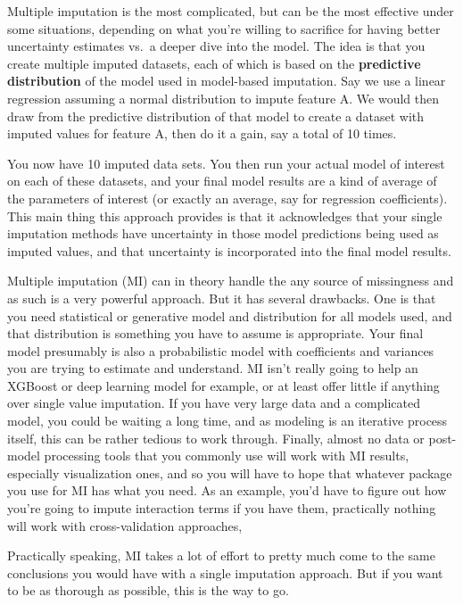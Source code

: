 \documentclass[
  letterpaper,
]{krantz}
\begin{document}
Multiple imputation is the most complicated, but can be the most
effective under some situations, depending on what you're willing to
sacrifice for having better uncertainty estimates vs.~a deeper dive into
the model. The idea is that you create multiple imputed datasets, each
of which is based on the \textbf{predictive distribution} of the model
used in model-based imputation. Say we use a linear regression assuming
a normal distribution to impute feature A. We would then draw from the
predictive distribution of that model to create a dataset with imputed
values for feature A, then do it a gain, say a total of 10 times.

You now have 10 imputed data sets. You then run your actual model of
interest on each of these datasets, and your final model results are a
kind of average of the parameters of interest (or exactly an average,
say for regression coefficients). This main thing this approach provides
is that it acknowledges that your single imputation methods have
uncertainty in those model predictions being used as imputed values, and
that uncertainty is incorporated into the final model results.

Multiple imputation (MI) can in theory handle the any source of
missingness and as such is a very powerful approach. But it has several
drawbacks. One is that you need statistical or generative model and
distribution for all models used, and that distribution is something you
have to assume is appropriate. Your final model presumably is also a
probabilistic model with coefficients and variances you are trying to
estimate and understand. MI isn't really going to help an XGBoost or
deep learning model for example, or at least offer little if anything
over single value imputation. If you have very large data and a
complicated model, you could be waiting a long time, and as modeling is
an iterative process itself, this can be rather tedious to work through.
Finally, almost no data or post-model processing tools that you commonly
use will work with MI results, especially visualization ones, and so you
will have to hope that whatever package you use for MI has what you
need. As an example, you'd have to figure out how you're going to impute
interaction terms if you have them, practically nothing will work with
cross-validation approaches,

Practically speaking, MI takes a lot of effort to pretty much come to
the same conclusions you would have with a single imputation approach.
But if you want to be as thorough as possible, this is the way to go.
\end{document}
